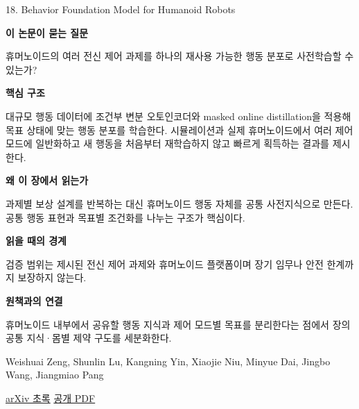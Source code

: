 \documentclass[11pt,openany]{book}
\begin{document}
\begin{termcard}{18. Behavior Foundation Model for Humanoid Robots}

\par

\medskip

{\sffamily\bfseries\color{deepblue} 이 논문이 묻는 질문}\par

휴머노이드의 여러 전신 제어 과제를 하나의 재사용 가능한 행동 분포로 사전학습할 수 있는가?

\smallskip

{\sffamily\bfseries\color{deepblue} 핵심 구조}\par

대규모 행동 데이터에 조건부 변분 오토인코더와 masked online distillation을 적용해 목표 상태에 맞는 행동 분포를 학습한다. 시뮬레이션과 실제 휴머노이드에서 여러 제어 모드에 일반화하고 새 행동을 처음부터 재학습하지 않고 빠르게 획득하는 결과를 제시한다.

\smallskip

{\sffamily\bfseries\color{deepblue} 왜 이 장에서 읽는가}\par

과제별 보상 설계를 반복하는 대신 휴머노이드 행동 자체를 공통 사전지식으로 만든다. 공통 행동 표현과 목표별 조건화를 나누는 구조가 핵심이다.

\smallskip

{\sffamily\bfseries\color{coral} 읽을 때의 경계}\par

검증 범위는 제시된 전신 제어 과제와 휴머노이드 플랫폼이며 장기 임무나 안전 한계까지 보장하지 않는다.

\smallskip

{\sffamily\bfseries\color{teal} 원책과의 연결}\par

휴머노이드 내부에서 공유할 행동 지식과 제어 모드별 목표를 분리한다는 점에서 장의 공통 지식·몸별 제약 구도를 세분화한다.

\medskip

{\footnotesize\color{muted} Weishuai Zeng, Shunlin Lu, Kangning Yin, Xiaojie Niu, Minyue Dai, Jingbo Wang, Jiangmiao Pang\par

\href{https://arxiv.org/abs/2509.13780}{arXiv 초록} \quad \href{https://arxiv.org/pdf/2509.13780}{공개 PDF}\par}

\end{termcard}
\end{document}
